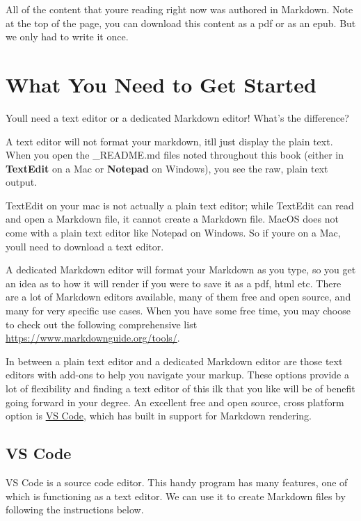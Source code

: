 \documentclass[
]{book}
\begin{document}
All of the content that you\textquotesingle re reading right now was authored in Markdown. Note at the top of the page, you can download this content as a pdf or as an epub. But we only had to write it once.

\section{What You Need to Get Started}\label{what-you-need-to-get-started}

You\textquotesingle ll need a text editor or a dedicated Markdown editor! What's the difference?

A text editor will not format your markdown, it\textquotesingle ll just display the plain text. When you open the \_README.md files noted throughout this book (either in \textbf{TextEdit} on a Mac or \textbf{Notepad} on Windows), you see the raw, plain text output.

TextEdit on your mac is not actually a plain text editor; while TextEdit can read and open a Markdown file, it cannot create a Markdown file. MacOS does not come with a plain text editor like Notepad on Windows. So if you\textquotesingle re on a Mac, you\textquotesingle ll need to download a text editor.

A dedicated Markdown editor will format your Markdown as you type, so you get an idea as to how it will render if you were to save it as a pdf, html etc. There are a lot of Markdown editors available, many of them free and open source, and many for very specific use cases. When you have some free time, you may choose to check out the following comprehensive list \url{https://www.markdownguide.org/tools/}.

In between a plain text editor and a dedicated Markdown editor are those text editors with add-ons to help you navigate your markup. These options provide a lot of flexibility and finding a text editor of this ilk that you like will be of benefit going forward in your degree. An excellent free and open source, cross platform option is \href{https://code.visualstudio.com/}{VS Code}, which has built in support for Markdown rendering.

\subsection*{VS Code}\label{vs-code}

VS Code is a source code editor. This handy program has many features, one of which is functioning as a text editor. We can use it to create Markdown files by following the instructions below.
\end{document}
